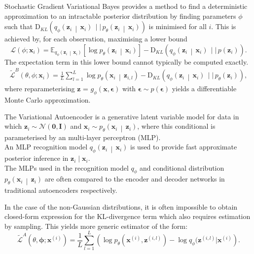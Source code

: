 \documentclass[landscape,a0b,final,a4resizeable]{include/a0poster}
\newcommand{\Func}[2]{#1 \left( #2\right)}
\newcommand{\FuncSq}[2]{#1 \left[ #2 \right]}
\newcommand{\CondFunc}[3]{#1 \left(#2 \, \middle\vert \, #3 \right)}
\newcommand{\pProb}[1]{\Func{p}{#1}}
\newcommand{\Expect}[2]{\FuncSq{\mathbb{E}_{#1}}{#2}}
\newcommand{\DivKL}[2]{\Func{\textrm{D}_{KL}}{#1 \, \mid \mid \, #2}}
\begin{document}
\begin{poster}
\begin{multicols}{3}
Stochastic Gradient Variational Bayes provides a method to find a deterministic approximation to an intractable posterior distribution by finding parameters $\phi$ such that $\DivKL{\CondFunc{q_\phi}{\mathbf{z}_i}{\mathbf{x}_i}}{\CondFunc{p_\theta}{\mathbf{z}_i}{\mathbf{x}_i}}$ is minimised for all $i$. This is achieved by, for each observation, maximising a lower bound
\begin{equation}
  \Func{\mathcal{L}}{\phi; \mathbf{x}_i} = \Expect{\CondFunc{q_\phi}{\mathbf{z}_i}{\mathbf{x}_i}}{\log \CondFunc{p_\theta}{\mathbf{z}_i}{\mathbf{x}_i}} - \DivKL{\CondFunc{q_\phi}{\mathbf{z}_i}{\mathbf{x}_i}}{\pProb{\mathbf{z}_i}}. \nonumber 
\end{equation}
The expectation term in this lower bound cannot typically be computed exactly.
\begin{align}
  \Func{\tilde{\mathcal{L}}^B}{\theta, \phi; \mathbf{x}_i} = \frac{1}{L} \sum_{l=1}^{L} \log \CondFunc{p_\theta}{\mathbf{x}_i}{\mathbf{z}_{i,l}} - \DivKL{\CondFunc{q_{\phi}}{\mathbf{z}_i}{\mathbf{x}_i}}{\Func{p_\theta}{\mathbf{z}_i}}, \nonumber 
\end{align}
where reparameterising $\mathbf{\mathbf{z}}$ = $g_\phi(\mathbf{x}, \mathbf{\epsilon})$ with  $\mathbf{\epsilon} \sim p(\mathbf{\epsilon})$ yields a differentiable Monte Carlo approximation.

\vspace{0.5in}

The Variational Autoencoder is a generative latent variable model for data in which $\mathbf{z}_i \sim \mathcal{N}(\mathbf{0}, \mathbf{I})$ and $\mathbf{x}_i \sim \CondFunc{p_\theta}{\mathbf{x}_i}{\mathbf{z}_i}$, where this conditional is parameterised by an multi-layer perceptron (MLP).\\

An MLP recognition model $\CondFunc{q_\phi}{\mathbf{z}_i}{\mathbf{x}_i}$ is used to provide fast approximate posterior inference in $\mathbf{z}_i \mid \mathbf{x}_i$.\\

The MLPs used in the recognition model $q_\phi$ and conditional distribution $\CondFunc{p_\theta}{\mathbf{x}_i}{\mathbf{z}_i}$ are often compared to the encoder and decoder networks in traditional autoencoders respectively.



\newpage %


In the case of the non-Gaussian distributions, it is often impossible to obtain closed-form expression for the KL-divergence term which also requires estimation by sampling. This yields more generic estimator of the form:
$$ \widetilde{\mathcal{L}}^{A}(\theta, \boldsymbol{\phi}; \mathbf{x}^{(i)}) = \frac{1}{L} \sum_{l=1}^L \left( \log p_{\theta}(\mathbf{x}^{(i)}, \mathbf{z}^{(i,l)}) - \log q_{\phi}(\mathbf{z}^{(i,l)} | \mathbf{x}^{(i)} \right).$$


\end{multicols}
\end{poster}
\end{document}
